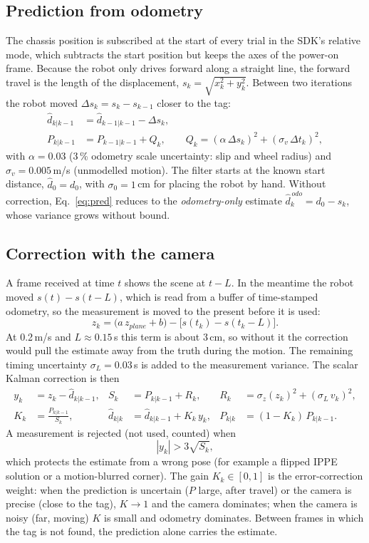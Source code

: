 \documentclass[11pt,a4paper]{article}
\begin{document}
\subsection{Prediction from odometry}
The chassis position is subscribed at the start of every trial in the SDK's relative mode, which subtracts the start position but keeps the axes of the power-on frame. Because the robot only drives forward along a straight line, the forward travel is the length of the displacement, $s_k=\sqrt{x_k^2+y_k^2}$. Between two iterations the robot moved $\Delta s_k=s_k-s_{k-1}$ closer to the tag:
\begin{align}
\hat d_{k|k-1}&=\hat d_{k-1|k-1}-\Delta s_k, \label{eq:pred}\\
P_{k|k-1}&=P_{k-1|k-1}+Q_k,\qquad Q_k=(\alpha\,\Delta s_k)^2+(\sigma_v\,\Delta t_k)^2, \label{eq:Q}
\end{align}
with $\alpha=0.03$ (3\,\% odometry scale uncertainty: slip and wheel radius) and $\sigma_v=0.005$\,m/s (unmodelled motion). The filter starts at the known start distance, $\hat d_0=d_0$, with $\sigma_0=1$\,cm for placing the robot by hand. Without correction, Eq.~\eqref{eq:pred} reduces to the \emph{odometry-only} estimate $\hat d^{\,odo}_k=d_0-s_k$, whose variance grows without bound.

\subsection{Correction with the camera}
A frame received at time $t$ shows the scene at $t-L$. In the meantime the robot moved $s(t)-s(t-L)$, which is read from a buffer of time-stamped odometry, so the measurement is moved to the present before it is used:
\begin{equation}
z_k=\big(a\,z_{plane}+b\big)-\big[s(t_k)-s(t_k-L)\big].
\label{eq:lat}
\end{equation}
At 0.2\,m/s and $L\approx0.15$\,s this term is about 3\,cm, so without it the correction would pull the estimate away from the truth during the motion. The remaining timing uncertainty $\sigma_L=0.03$\,s is added to the measurement variance. The scalar Kalman correction is then
\begin{align}
y_k&=z_k-\hat d_{k|k-1}, & S_k&=P_{k|k-1}+R_k, & R_k&=\sigma_z(z_k)^2+(\sigma_L\,v_k)^2,\label{eq:innov}\\
K_k&=\frac{P_{k|k-1}}{S_k}, & \hat d_{k|k}&=\hat d_{k|k-1}+K_k\,y_k, & P_{k|k}&=(1-K_k)\,P_{k|k-1}.\label{eq:update}
\end{align}
A measurement is rejected (not used, counted) when
\begin{equation}
|y_k|>3\sqrt{S_k},
\label{eq:gate}
\end{equation}
which protects the estimate from a wrong pose (for example a flipped IPPE solution or a motion-blurred corner).
The gain $K_k\in[0,1]$ is the error-correction weight: when the prediction is uncertain ($P$ large, after travel) or the camera is precise (close to the tag), $K\to1$ and the camera dominates; when the camera is noisy (far, moving) $K$ is small and odometry dominates. Between frames in which the tag is not found, the prediction alone carries the estimate.
\end{document}
